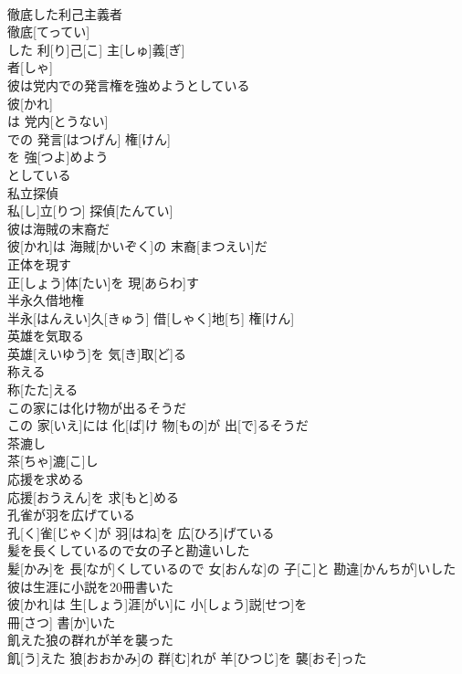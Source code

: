 \documentclass[8pt]{extreport}
\begin{document}
\begin{CJK}{UTF8}{min}
\\	徹底した利己主義者	
\\	徹底[てってい]
\\	した 利[り]己[こ] 主[しゅ]義[ぎ]
\\	者[しゃ]
\\	彼は党内での発言権を強めようとしている	
\\	彼[かれ]
\\	は 党内[とうない]
\\	での 発言[はつげん] 権[けん]
\\	を 強[つよ]めよう 
\\	としている
\\	私立探偵	
\\	私[し]立[りつ] 探偵[たんてい]
\\	彼は海賊の末裔だ	
\\	彼[かれ]は 海賊[かいぞく]の 末裔[まつえい]だ
\\	正体を現す	
\\	正[しょう]体[たい]を 現[あらわ]す
\\	半永久借地権	
\\	半永[はんえい]久[きゅう] 借[しゃく]地[ち] 権[けん]
\\	英雄を気取る	
\\	英雄[えいゆう]を 気[き]取[ど]る
\\	称える	
\\	称[たた]える 
\\	この家には化け物が出るそうだ	
\\	この 家[いえ]には 化[ば]け 物[もの]が 出[で]るそうだ
\\	茶漉し	
\\	茶[ちゃ]漉[こ]し
\\	応援を求める	
\\	応援[おうえん]を 求[もと]める
\\	孔雀が羽を広げている	
\\	孔[く]雀[じゃく]が 羽[はね]を 広[ひろ]げている
\\	髪を長くしているので女の子と勘違いした	
\\	髪[かみ]を 長[なが]くしているので 女[おんな]の 子[こ]と 勘違[かんちが]いした
\\	彼は生涯に小説を20冊書いた	
\\	彼[かれ]は 生[しょう]涯[がい]に 小[しょう]説[せつ]を 
\\	冊[さつ] 書[か]いた
\\	飢えた狼の群れが羊を襲った	
\\	飢[う]えた 狼[おおかみ]の 群[む]れが 羊[ひつじ]を 襲[おそ]った

\end{CJK}
\end{document}
